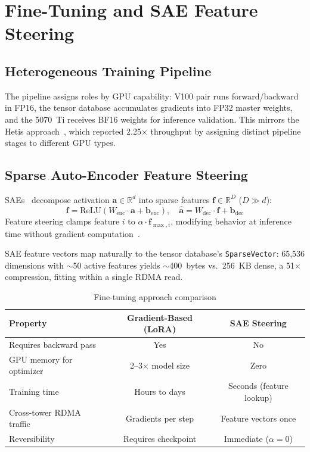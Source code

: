 \documentclass[11pt,letterpaper]{article}
\theoremstyle{definition}
\begin{document}
\section{Fine-Tuning and SAE Feature Steering}
\label{sec:finetuning-sae}

\subsection{Heterogeneous Training Pipeline}

The pipeline assigns roles by GPU capability: V100 pair runs forward/backward in FP16, the tensor database accumulates gradients into FP32 master weights, and the 5070~Ti receives BF16 weights for inference validation. This mirrors the Hetis approach~\cite{hetis2024}, which reported 2.25$\times$ throughput by assigning distinct pipeline stages to different GPU types.

\subsection{Sparse Auto-Encoder Feature Steering}
\label{sec:sae}

SAEs~\cite{cunningham2023sae} decompose activation $\mathbf{a} \in \mathbb{R}^d$ into sparse features $\mathbf{f} \in \mathbb{R}^D$ ($D \gg d$):
\begin{equation}
    \mathbf{f} = \text{ReLU}(W_{\text{enc}} \cdot \mathbf{a} + \mathbf{b}_{\text{enc}}), \quad
    \hat{\mathbf{a}} = W_{\text{dec}} \cdot \mathbf{f} + \mathbf{b}_{\text{dec}}
\end{equation}
Feature steering clamps feature $i$ to $\alpha \cdot \mathbf{f}_{\max,i}$, modifying behavior at inference time without gradient computation~\cite{eiffel-tower-llama}.

SAE feature vectors map naturally to the tensor database's \texttt{SparseVector}: 65,536 dimensions with $\sim$50 active features yields $\sim$400~bytes vs.\ 256~KB dense, a 51$\times$ compression, fitting within a single RDMA read.

\begin{table}[htbp]
\centering
\caption{Fine-tuning approach comparison}
\label{tab:finetuning-comparison}
\begin{tabular}{@{}lcc@{}}
\toprule
\textbf{Property} & \textbf{Gradient-Based (LoRA)} & \textbf{SAE Steering} \\
\midrule
Requires backward pass & Yes & No \\
GPU memory for optimizer & 2--3$\times$ model size & Zero \\
Training time & Hours to days & Seconds (feature lookup) \\
Cross-tower RDMA traffic & Gradients per step & Feature vectors once \\
Reversibility & Requires checkpoint & Immediate ($\alpha = 0$) \\
\bottomrule
\end{tabular}
\end{table}
\end{document}
